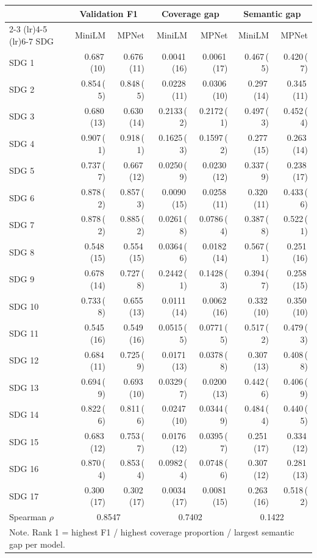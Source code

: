 \small
\begin{tabular}{lrrrrrr}
\toprule
& \multicolumn{2}{c}{Validation F1} & \multicolumn{2}{c}{Coverage gap} & \multicolumn{2}{c}{Semantic gap} \\
\cmidrule(lr){2-3} \cmidrule(lr){4-5} \cmidrule(lr){6-7}
SDG & MiniLM & MPNet & MiniLM & MPNet & MiniLM & MPNet \\
\midrule
SDG  1 & 0.687\,(10) & 0.676\,(11) & 0.0041\,(16) & 0.0061\,(17) & 0.467\,( 5) & 0.420\,( 7) \\
SDG  2 & 0.854\,( 5) & 0.848\,( 5) & 0.0228\,(11) & 0.0306\,(10) & 0.297\,(14) & 0.345\,(11) \\
SDG  3 & 0.680\,(13) & 0.630\,(14) & 0.2133\,( 2) & 0.2172\,( 1) & 0.497\,( 3) & 0.452\,( 4) \\
SDG  4 & 0.907\,( 1) & 0.918\,( 1) & 0.1625\,( 3) & 0.1597\,( 2) & 0.277\,(15) & 0.263\,(14) \\
SDG  5 & 0.737\,( 7) & 0.667\,(12) & 0.0250\,( 9) & 0.0230\,(12) & 0.337\,( 9) & 0.238\,(17) \\
SDG  6 & 0.878\,( 2) & 0.857\,( 3) & 0.0090\,(15) & 0.0258\,(11) & 0.320\,(11) & 0.433\,( 6) \\
SDG  7 & 0.878\,( 2) & 0.885\,( 2) & 0.0261\,( 8) & 0.0786\,( 4) & 0.387\,( 8) & 0.522\,( 1) \\
SDG  8 & 0.548\,(15) & 0.554\,(15) & 0.0364\,( 6) & 0.0182\,(14) & 0.567\,( 1) & 0.251\,(16) \\
SDG  9 & 0.678\,(14) & 0.727\,( 8) & 0.2442\,( 1) & 0.1428\,( 3) & 0.394\,( 7) & 0.258\,(15) \\
SDG 10 & 0.733\,( 8) & 0.655\,(13) & 0.0111\,(14) & 0.0062\,(16) & 0.332\,(10) & 0.350\,(10) \\
SDG 11 & 0.545\,(16) & 0.549\,(16) & 0.0515\,( 5) & 0.0771\,( 5) & 0.517\,( 2) & 0.479\,( 3) \\
SDG 12 & 0.684\,(11) & 0.725\,( 9) & 0.0171\,(13) & 0.0378\,( 8) & 0.307\,(13) & 0.408\,( 8) \\
SDG 13 & 0.694\,( 9) & 0.693\,(10) & 0.0329\,( 7) & 0.0200\,(13) & 0.442\,( 6) & 0.406\,( 9) \\
SDG 14 & 0.822\,( 6) & 0.811\,( 6) & 0.0247\,(10) & 0.0344\,( 9) & 0.484\,( 4) & 0.440\,( 5) \\
SDG 15 & 0.683\,(12) & 0.753\,( 7) & 0.0176\,(12) & 0.0395\,( 7) & 0.251\,(17) & 0.334\,(12) \\
SDG 16 & 0.870\,( 4) & 0.853\,( 4) & 0.0982\,( 4) & 0.0748\,( 6) & 0.307\,(12) & 0.281\,(13) \\
SDG 17 & 0.300\,(17) & 0.302\,(17) & 0.0034\,(17) & 0.0081\,(15) & 0.263\,(16) & 0.518\,( 2) \\
\midrule
Spearman $\rho$ & \multicolumn{2}{c}{0.8547} & \multicolumn{2}{c}{0.7402} & \multicolumn{2}{c}{0.1422} \\
\multicolumn{7}{l}{\footnotesize Note. Rank 1 = highest F1 / highest coverage proportion / largest semantic gap per model.}\\
\bottomrule
\end{tabular}
